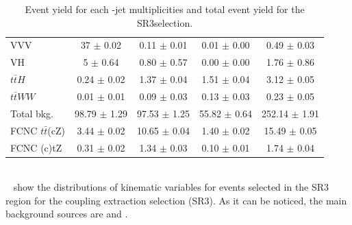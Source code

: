 \begin{table}[!h]
\begin{tabular}{|l|c|c|c|c|}
		VVV &                   37 $\pm$ 0.02     & 0.11 $\pm$ 0.01   & 0.01 $\pm$ 0.00   &  0.49 $\pm$ 0.03   \\
		VH &                    5 $\pm$ 0.64      & 0.80 $\pm$ 0.57   & 0.00 $\pm$ 0.00   &  1.76 $\pm$ 0.86   \\
		$t\bar{t}H$ &           0.24 $\pm$ 0.02   & 1.37 $\pm$ 0.04   & 1.51 $\pm$ 0.04   &  3.12 $\pm$ 0.05   \\
		$t\bar{t}WW$ &          0.01 $\pm$ 0.01   & 0.09 $\pm$ 0.03   & 0.13 $\pm$ 0.03   &  0.23 $\pm$ 0.05   \\
		\hline                                                                            
		Total bkg. &            98.79 $\pm$ 1.29  & 97.53 $\pm$ 1.25  & 55.82 $\pm$ 0.64  &  252.14 $\pm$ 1.91  \\
		\hline                                                                            
		FCNC $t\bar{t}$(cZ) &        3.44 $\pm$ 0.02   & 10.65 $\pm$ 0.04  & 1.40 $\pm$ 0.02   &  15.49 $\pm$ 0.05  \\
		FCNC (c)tZ &            0.31 $\pm$ 0.02   & 1.34 $\pm$ 0.03   & 0.10 $\pm$ 0.01   &  1.74 $\pm$ 0.04  \\
		\hline                                                                                     
	\end{tabular}
	\caption{Event yield for each \Pqb-jet multiplicities and total event yield for the SR3\tZc selection.}
	\label{tab:yields:sr3}
\end{table}    
\\~ show the distributions of kinematic variables for events selected in the SR3 region for the \tZc coupling extraction selection (SR3\tZc).
As it can be noticed, the main background sources are \ttZ and \VVHF.


